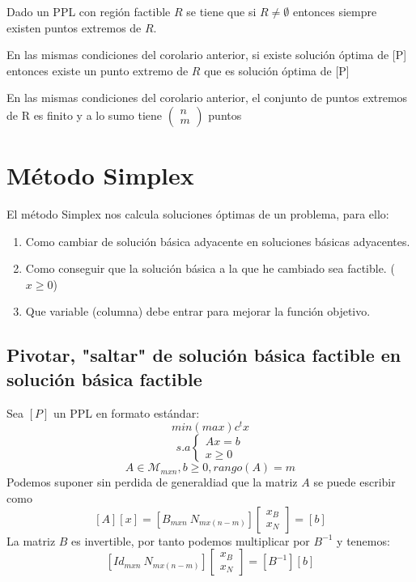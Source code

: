 \documentclass[11pt,fleqn]{book} %
\begin{document}
\begin{corollary}
  Dado un PPL con región factible $R$ se tiene que si $R \neq \emptyset$ entonces siempre existen puntos extremos de $R$.
\end{corollary}
\begin{corollary}
  En las mismas condiciones del corolario anterior, si existe solución óptima de [P] entonces existe un punto extremo de $R$ que es solución óptima de [P]
\end{corollary}
\begin{corollary}
  En las mismas condiciones del corolario anterior, el conjunto de puntos extremos de R es finito y a lo sumo tiene $\left(\begin{array}{c}
	n \\ m
  \end{array}\right)$ puntos
\end{corollary}

\section{Método Simplex}
El método Simplex nos calcula soluciones óptimas de un problema, para ello:
\begin{enumerate}
\item Como cambiar de solución básica adyacente en soluciones básicas adyacentes.
\item Como conseguir que la solución básica a la que he cambiado sea factible. ($x \geq 0$)
\item Que variable (columna) debe entrar para mejorar la función objetivo.
\end{enumerate}
\subsection{Pivotar, "saltar" de solución básica factible en solución básica factible}
Sea $[P]$ un PPL en formato estándar:
$$ min(max) c^t x$$
$$
s.a \left\{\begin{array}{c}
Ax=b \\
x \geq 0
\end{array}\right.
$$
$$ A \in \mathcal{M}_{mxn}, b\geq 0, rango(A)=m$$
Podemos suponer sin perdida de generaldiad que la matriz $A$ se puede escribir como $$[A][x]=[B_{mxn} ~ N_{mx(n-m)}]\left[\begin{array}{c}
    x_B \\
    x_N
  \end{array}\right]=[b]$$
La matriz $B$ es invertible, por tanto podemos multiplicar por $B^{-1}$ y tenemos:
$$[Id_{mxn} ~ N_{mx(n-m)}]\left[\begin{array}{c}
    x_B \\
    x_N
  \end{array}\right]=[B^{-1}][b]$$
\end{document}

